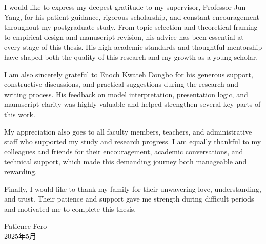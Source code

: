 \begin{acknowledgement}

I would like to express my deepest gratitude to my supervisor, Professor Jun Yang, for his patient guidance, rigorous scholarship, and constant encouragement throughout my postgraduate study. From topic selection and theoretical framing to empirical design and manuscript revision, his advice has been essential at every stage of this thesis. His high academic standards and thoughtful mentorship have shaped both the quality of this research and my growth as a young scholar.

I am also sincerely grateful to Enoch Kwateh Dongbo for his generous support, constructive discussions, and practical suggestions during the research and writing process. His feedback on model interpretation, presentation logic, and manuscript clarity was highly valuable and helped strengthen several key parts of this work.

My appreciation also goes to all faculty members, teachers, and administrative staff who supported my study and research progress. I am equally thankful to my colleagues and friends for their encouragement, academic conversations, and technical support, which made this demanding journey both manageable and rewarding.

Finally, I would like to thank my family for their unwavering love, understanding, and trust. Their patience and support gave me strength during difficult periods and motivated me to complete this thesis.

\vspace{1cm}
\begin{flushright}
Patience Fero\\
2025年5月
\end{flushright}

\end{acknowledgement}
